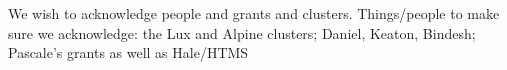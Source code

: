 \documentclass[%
 reprint,
 amsmath,amssymb,
 aps,
]{revtex4-2}
\begin{document}
\begin{acknowledgments}
We wish to acknowledge people and grants and clusters. Things/people to make sure we acknowledge: the Lux and Alpine clusters; Daniel, Keaton, Bindesh; Pascale's grants as well as Hale/HTMS
\end{acknowledgments}


\end{document}
